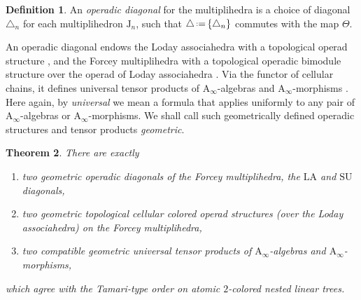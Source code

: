 \documentclass{amsart}
\newcommand{\darkblue}{\color{darkblue}} %
\newtheorem{theorem}{Theorem}[section]
\theoremstyle{definition}
\newtheorem{definition}[theorem]{Definition}
\newcommand{\J}{\mathrm{J}} %
\newcommand{\eqdef}{\mbox{\,\raisebox{0.2ex}{\scriptsize\ensuremath{\mathrm:}}\ensuremath{=}\,}} %
\newcommand{\defn}[1]{\textsl{\darkblue #1}} %
\newcommand{\SU}{\mathrm{SU}}
\newcommand{\LA}{\mathrm{LA}}
\newcommand{\Ainf}{\ensuremath{\mathrm{A}_\infty}}
\begin{document}
\begin{definition}
	An \defn{operadic diagonal} for the multiplihedra is a choice of diagonal $\triangle_n$ for each multiplihedron $\J_n$, such that $\triangle \eqdef \{\triangle_n\}$ commutes with the map $\Theta$.
\end{definition}

An operadic diagonal endows the Loday associahedra with a topological operad structure \cite[Thm.~1]{MasudaThomasTonksVallette}, and the Forcey multiplihedra with a topological operadic bimodule structure over the operad of Loday associahedra \cite[Thm.~1]{LaplanteAnfossiMazuir}.
Via the functor of cellular chains, it defines universal tensor products of $\Ainf$-algebras and $\Ainf$-morphisms \cite[Sec.~4.2.1]{LaplanteAnfossiMazuir}.
Here again, by \emph{universal} we mean a formula that applies uniformly to any pair of $\Ainf$-algebras or $\Ainf$-morphisms.
We shall call such geometrically defined operadic structures and tensor products \emph{geometric}. 

\begin{theorem}
\label{thm:multiplihedra}
There are exactly 
\begin{enumerate}
\item two geometric operadic diagonals of the Forcey multiplihedra, the $\LA$ and $\SU$ diagonals,
\item two geometric topological cellular colored operad structures (over the Loday associahedra) on the Forcey multiplihedra,
\item two compatible geometric universal tensor products of $\Ainf$-algebras and $\Ainf$-morphisms,
\end{enumerate}
which agree with the Tamari-type order on atomic $2$-colored nested linear trees. 
\end{theorem}
\end{document}
